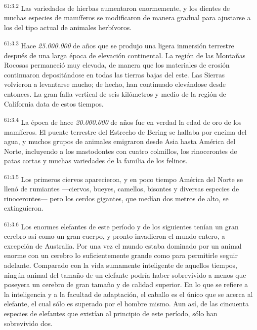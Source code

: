 \par
\textsuperscript{61:3.2} Las variedades de hierbas aumentaron enormemente, y los dientes de muchas especies de mamíferos se modificaron de manera gradual para ajustarse a los del tipo actual de animales herbívoros.

\par
\textsuperscript{61:3.3} Hace \textit{25.000.000} de años que se produjo una ligera inmersión terrestre después de una larga época de elevación continental. La región de las Montañas Rocosas permaneció muy elevada, de manera que los materiales de erosión continuaron depositándose en todas las tierras bajas del este. Las Sierras volvieron a levantarse mucho; de hecho, han continuado elevándose desde entonces. La gran falla vertical de seis kilómetros y medio de la región de California data de estos tiempos.

\par
\textsuperscript{61:3.4} La época de hace \textit{20.000.000} de años fue en verdad la edad de oro de los mamíferos. El puente terrestre del Estrecho de Bering se hallaba por encima del agua, y muchos grupos de animales emigraron desde Asia hasta América del Norte, incluyendo a los mastodontes con cuatro colmillos, los rinocerontes de patas cortas y muchas variedades de la familia de los felinos.

\par
\textsuperscript{61:3.5} Los primeros ciervos aparecieron, y en poco tiempo América del Norte se llenó de rumiantes ---ciervos, bueyes, camellos, bisontes y diversas especies de rinocerontes--- pero los cerdos gigantes, que medían dos metros de alto, se extinguieron.

\par
\textsuperscript{61:3.6} Los enormes elefantes de este período y de los siguientes tenían un gran cerebro así como un gran cuerpo, y pronto invadieron el mundo entero, a excepción de Australia. Por una vez el mundo estaba dominado por un animal enorme con un cerebro lo suficientemente grande como para permitirle seguir adelante. Comparado con la vida sumamente inteligente de aquellos tiempos, ningún animal del tamaño de un elefante podría haber sobrevivido a menos que poseyera un cerebro de gran tamaño y de calidad superior. En lo que se refiere a la inteligencia y a la facultad de adaptación, el caballo es el único que se acerca al elefante, el cual sólo es superado por el hombre mismo. Aun así, de las cincuenta especies de elefantes que existían al principio de este período, sólo han sobrevivido dos.

